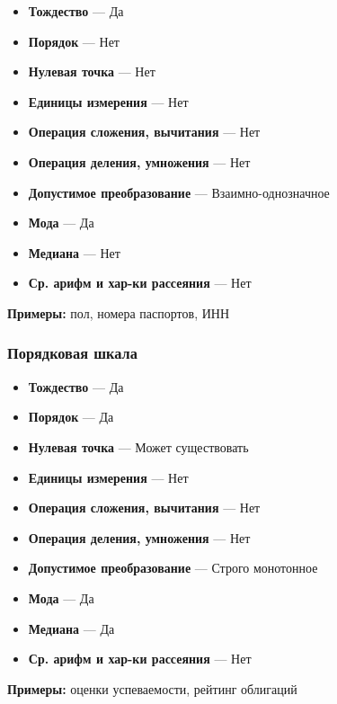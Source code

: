 \documentclass{article}
\begin{document}
    \begin{itemize}
        \item \textbf{Тождество} --- Да
        \item \textbf{Порядок} --- Нет
        \item \textbf{Нулевая точка} --- Нет
        \item \textbf{Единицы измерения} --- Нет
        \item \textbf{Операция сложения, вычитания} --- Нет
        \item \textbf{Операция деления, умножения} --- Нет
        \item \textbf{Допустимое преобразование} --- Взаимно-однозначное
        \item \textbf{Мода} --- Да
        \item \textbf{Медиана} --- Нет
        \item \textbf{Ср. арифм и хар-ки рассеяния} --- Нет
    \end{itemize}

    \textbf{Примеры:} пол, номера паспортов, ИНН


    \subsubsection{Порядковая шкала}

    \begin{itemize}
        \item \textbf{Тождество} --- Да
        \item \textbf{Порядок} --- Да
        \item \textbf{Нулевая точка} --- Может существовать
        \item \textbf{Единицы измерения} --- Нет
        \item \textbf{Операция сложения, вычитания} --- Нет
        \item \textbf{Операция деления, умножения} --- Нет
        \item \textbf{Допустимое преобразование} --- Строго монотонное
        \item \textbf{Мода} --- Да
        \item \textbf{Медиана} --- Да
        \item \textbf{Ср. арифм и хар-ки рассеяния} --- Нет
    \end{itemize}

    \textbf{Примеры:} оценки успеваемости, рейтинг облигаций
\end{document}

